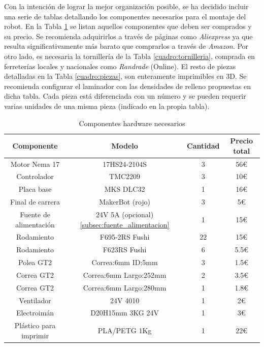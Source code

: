 Con la intención de lograr la mejor organización posible, se ha decidido incluir una serie de tablas 
detallando los componentes necesarios para el montaje del robot. En la Tabla \ref{cuadro:componentes} se listan aquellos 
componentes que deben ser comprados y su precio. Se recomienda adquirirlos a través de páginas como \textit{Aliexpress} ya que 
resulta significativamente más barato que comprarlos a través de \textit{Amazon}. Por otro lado, es necesaria la tornillería 
de la Tabla \ref{cuadro:tornilleria}, comprada en ferreterías locales y nacionales como \textit{Randrade} (Online). El resto 
de piezas detalladas en la Tabla \ref{cuadro:piezas}, son enteramente imprimibles en 3D. Se recomienda configurar el laminador 
con las densidades de relleno propuestas en dicha tabla. Cada pieza está diferenciada con un número y se pueden requerir varias 
unidades de una misma pieza (indicado en la propia tabla).
\begin{table}[H]
\begin{center}
\begin{tabular}{|c|c|c|c|}
\hline
\textbf{Componente} & \textbf{Modelo} & \textbf{Cantidad} & \textbf{Precio total} \\
\hline
Motor Nema 17 & 17HS24-2104S & 3 & 56\euro \\
Controlador & TMC2209 & 3 & 10\euro \\
Placa base & MKS DLC32 & 1 & 16\euro \\
Final de carrera & MakerBot (rojo) & 3 & 5\euro \\
Fuente de alimentación & 24V 5A (opcional)\ref{subsec:fuente_alimentacion} & 1 & 15\euro \\
Rodamiento &  F695-2RS Fushi & 22 & 15\euro \\
Rodamiento & F623RS Fushi & 6 & 5.5\euro \\
Polea GT2 & Correa:6mm ID:5mm & 3 & 1.5\euro \\
Correa GT2 & Correa:6mm Largo:252mm & 2 & 3.5\euro \\ 
Correa GT2 &  Correa:6mm Largo:280mm & 1 & 1.8\euro \\ 
Ventilador & 24V 4010 & 1 & 2\euro \\
Electroimán & D20H15mm 3KG 24V & 1 & 3\euro \\
Plástico para imprimir & PLA/PETG 1Kg & 1 & 22\euro \\
\hline
\end{tabular}
\caption{Componentes hardware necesarios}
\label{cuadro:componentes}
\end{center}
\end{table}

